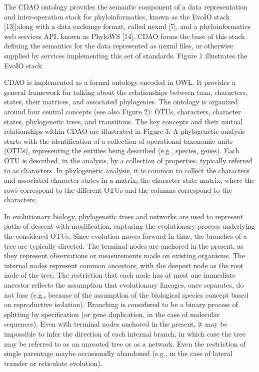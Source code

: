 \documentclass[10pt]{article}
\begin{document}
The CDAO ontology provides the semantic component of a data representation and inter-operation stack for phyloinformatics, known as the EvoIO stack [13]|along with a data exchange format, called nexml [7], and a phyloinformatics web services API, known as PhyloWS [14]. CDAO forms the base of this stack defining the semantics for the data represented as nexml files, or otherwise supplied by services implementing this set of standards.  Figure 1 illustrates the EvoIO stack.


CDAO is implemented as a formal ontology encoded in OWL. It provides a general framework for talking about the relationships between taxa, characters, states, their matrices, and associated phylogenies. The ontology is organized around four central concepts (see also Figure 2): OTUs, characters, character states, phylogenetic trees, and transitions. The key concepts and their mutual relationships within CDAO are illustrated in Figure 3.  A phylogenetic analysis starts with the identification of a collection of operational taxonomic units (OTUs), representing the entities being described (e.g., species, genes). Each OTU is described, in the analysis, by a collection of properties, typically referred to as characters. In phylogenetic analysis, it is common to collect the characters and associated character states in a matrix, the character state matrix, where the rows correspond to the different OTUs and the columns correspond to the characters.


In evolutionary biology, phylogenetic trees and networks are used to represent paths of descent-with-modification, capturing the evolutionary process underlying the considered OTUs.  Since evolution moves forward in time, the branches of a tree are typically directed. The terminal nodes are anchored in the present, as they represent observations or measurements made on existing organisms. The internal nodes represent common ancestors, with the deepest node as the root node of the tree. The restriction that each node has at most one immediate ancestor reflects the assumption that evolutionary lineages, once separates, do not fuse (e.g., because of the assumption of the biological species concept based on reproductive isolation). Branching is considered to be a binary process of splitting by specification (or gene duplication, in the case of molecular sequences). Even with terminal nodes anchored in the present, it may be impossible to infer the direction of each internal branch, in which case the tree may be referred to as an unrooted tree or as a network. Even the restriction of single parentage maybe occasionally abandoned (e.g., in the case of lateral transfer or reticulate evolution).
\end{document}
